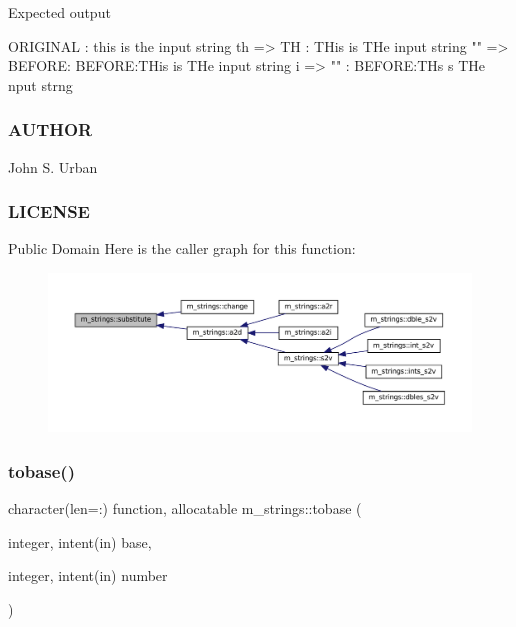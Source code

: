 Expected output \begin{DoxyVerb} ORIGINAL    : this is the input string
 th => TH    : THis is THe input string
 "" => BEFORE: BEFORE:THis is THe input string
 i => ""     : BEFORE:THs s THe nput strng
\end{DoxyVerb}
 \subsubsection*{A\+U\+T\+H\+OR}

John S. Urban \subsubsection*{L\+I\+C\+E\+N\+SE}

Public Domain Here is the caller graph for this function\+:
\nopagebreak
\begin{figure}[H]
\begin{center}
\leavevmode
\includegraphics[width=350pt]{namespacem__strings_ab84a4b7c2be211433c2d1b435a87fa32_icgraph}
\end{center}
\end{figure}
\mbox{\label{namespacem__strings_aa896d221112afb3dbc90eeca6075b282}} 
\subsubsection{\texorpdfstring{tobase()}{tobase()}}
{\footnotesize\ttfamily character(len=\+:) function, allocatable m\+\_\+strings\+::tobase (\begin{DoxyParamCaption}\item[{integer, intent(in)}]{base,  }\item[{integer, intent(in)}]{number }\end{DoxyParamCaption})\hspace{0.3cm}{\ttfamily [private]}}



